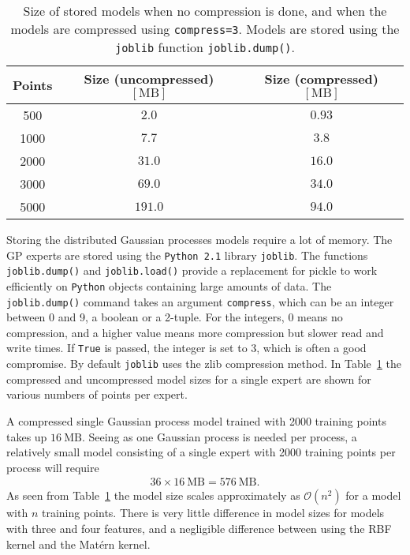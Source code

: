\documentclass[twoside,english]{uiofysmaster}
\begin{document}
{{\begin{table}
\centering
\begin{tabular}{@{}ccc@{}} \toprule
Points & Size (uncompressed) $[\mathrm{MB}]$ & Size (compressed) $[\mathrm{MB}]$\\ \midrule
500 & $2.0$ & $0.93$\\
1000 & $7.7$ & $3.8$\\
2000 & $31.0$ & $16.0$\\
3000 & $69.0$ & $34.0$ \\
5000 & $191.0$ & $94.0$\\ \bottomrule
\end{tabular}
\caption{Size of stored models when no compression is done, and when the models are compressed using {\tt compress=3}. Models are stored using the {\tt joblib} function {\tt joblib.dump()}. }
\label{Tab:: results : Model sizes, uncompressed and compressed}
\end{table}

Storing the distributed Gaussian processes models require a lot of memory. The GP experts are stored using the \verb|Python 2.1| library \verb|joblib|. The functions \verb|joblib.dump()| and \verb|joblib.load()| provide a replacement for pickle to work efficiently on \verb|Python| objects containing large amounts of data. The \verb|joblib.dump()| command takes an argument \verb|compress|, which can be an integer between 0 and 9, a boolean or a 2-tuple. For the integers, 0 means no compression, and a higher value means more compression but slower read and write times. If \verb|True| is passed, the integer is set to 3, which is often a good compromise. By default \verb|joblib| uses the zlib compression method. In Table~\ref{Tab:: results : Model sizes, uncompressed and compressed} the compressed and uncompressed model sizes for a single expert are shown for various numbers of points per expert.

A compressed single Gaussian process model trained with 2000 training points takes up $16~\mathrm{MB}$. Seeing as one Gaussian process is needed per process, a relatively small model consisting of a single expert with 2000 training points per process will require
\begin{align*}
36 \times 16~ \text{MB} = 576~\text{MB}.
\end{align*}
As seen from Table~\ref{Tab:: results : Model sizes, uncompressed and compressed} the model size scales approximately as $\mathcal{O}( n^2)$ for a model with $n$ training points. There is very little difference in model sizes for models with three and four features, and a negligible difference between using the RBF kernel and the Mat\'{e}rn kernel. 

}}
\end{document}
